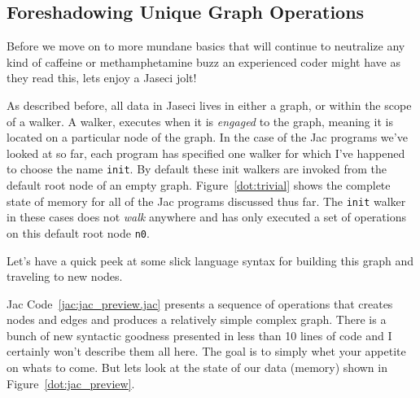 \subsection{Foreshadowing Unique Graph Operations}
Before we move on to more mundane basics that will continue to neutralize any kind of caffeine or methamphetamine buzz an experienced \gls{coder} might have as they read this, lets enjoy a \gls{Jaseci jolt}!
\par
As described before, all data in Jaseci lives in either a graph, or within the scope of a \gls{walker}. A walker, executes when it is \emph{engaged} to the graph, meaning it is located on a particular node of the graph. In the case of the Jac programs we've looked at so far, each program has specified one walker for which I've happened to choose the name \texttt{init}. By default these init walkers are invoked from the default root node of an empty graph. Figure~\ref{dot:trivial} shows the complete state of memory for all of the Jac programs discussed thus far. The \texttt{init} walker in these cases does not \emph{walk} anywhere and has only executed a set of operations on this default root node \texttt{n0}.
\par
Let's have a quick peek at some slick language syntax for building this graph and traveling to new nodes.
\par
{}
\par
{}
Jac Code~\ref{jac:jac_preview.jac} presents a sequence of operations that creates nodes and edges and produces a relatively simple complex graph. There is a bunch of new syntactic goodness presented in less than 10 lines of code and I certainly won't describe them all here. The goal is to simply whet your appetite on whats to come. But lets look at the state of our data (memory) shown in Figure~\ref{dot:jac_preview}.


